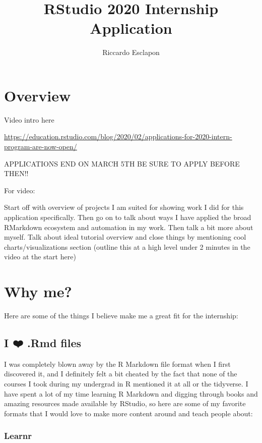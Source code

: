 \documentclass[
]{book}
\title{RStudio 2020 Internship Application}
\author{Riccardo Esclapon}
\date{}
\begin{document}
\maketitle

{
\setcounter{tocdepth}{1}
\tableofcontents
}
\hypertarget{overview}{%
\chapter{Overview}\label{overview}}

Video intro here

\url{https://education.rstudio.com/blog/2020/02/applications-for-2020-intern-program-are-now-open/}

APPLICATIONS END ON MARCH 5TH BE SURE TO APPLY BEFORE THEN!!

For video:

Start off with overview of projects I am suited for showing work I did for this application specifically. Then go on to talk about ways I have applied the broad RMarkdown ecosystem and automation in my work. Then talk a bit more about myself. Talk about ideal tutorial overview and close things by mentioning cool charts/visualizations section (outline this at a high level under 2 minutes in the video at the start here)

\hypertarget{fit}{%
\chapter{Why me?}\label{fit}}

Here are some of the things I believe make me a great fit for the internship:

\hypertarget{i-uxfe0f-.rmd-files}{%
\section{I ❤️ .Rmd files}\label{i-uxfe0f-.rmd-files}}

I was completely blown away by the R Markdown file format when I first discovered it, and I definitely felt a bit cheated by the fact that none of the courses I took during my undergrad in R mentioned it at all or the tidyverse. I have spent a lot of my time learning R Markdown and digging through books and amazing resources made available by RStudio, so here are some of my favorite formats that I would love to make more content around and teach people about:

\hypertarget{learnr}{%
\subsection{Learnr}\label{learnr}}
\end{document}
